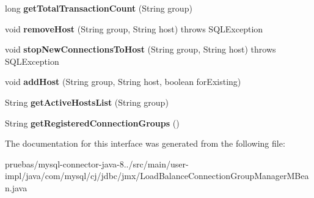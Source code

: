 \begin{DoxyCompactItemize}
\item 
\mbox{\label{interfacecom_1_1mysql_1_1cj_1_1jdbc_1_1jmx_1_1_load_balance_connection_group_manager_m_bean_a568d8a28564e0e4f6ddc61e598ec757e}} 
long {\bfseries get\+Total\+Transaction\+Count} (String group)
\item 
\mbox{\label{interfacecom_1_1mysql_1_1cj_1_1jdbc_1_1jmx_1_1_load_balance_connection_group_manager_m_bean_a62791f1b8cf09bff2624d9706d385d1a}} 
void {\bfseries remove\+Host} (String group, String host)  throws S\+Q\+L\+Exception
\item 
\mbox{\label{interfacecom_1_1mysql_1_1cj_1_1jdbc_1_1jmx_1_1_load_balance_connection_group_manager_m_bean_a8f15db86412fbd3a8e43da0e1bc78fd6}} 
void {\bfseries stop\+New\+Connections\+To\+Host} (String group, String host)  throws S\+Q\+L\+Exception
\item 
\mbox{\label{interfacecom_1_1mysql_1_1cj_1_1jdbc_1_1jmx_1_1_load_balance_connection_group_manager_m_bean_ac75da8bca9d66ddf61f38d40637e6277}} 
void {\bfseries add\+Host} (String group, String host, boolean for\+Existing)
\item 
\mbox{\label{interfacecom_1_1mysql_1_1cj_1_1jdbc_1_1jmx_1_1_load_balance_connection_group_manager_m_bean_acab93052475e7203a5d66783ea41a5e4}} 
String {\bfseries get\+Active\+Hosts\+List} (String group)
\item 
\mbox{\label{interfacecom_1_1mysql_1_1cj_1_1jdbc_1_1jmx_1_1_load_balance_connection_group_manager_m_bean_a9eff7e6cc2a298da10fd288d695ae89e}} 
String {\bfseries get\+Registered\+Connection\+Groups} ()
\end{DoxyCompactItemize}


The documentation for this interface was generated from the following file\+:\begin{DoxyCompactItemize}
\item 
pruebas/mysql-\/connector-\/java-\/8../src/main/user-\/impl/java/com/mysql/cj/jdbc/jmx/Load\+Balance\+Connection\+Group\+Manager\+M\+Bean.\+java\end{DoxyCompactItemize}
